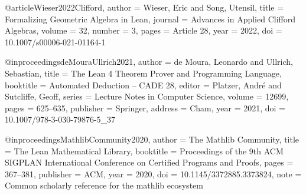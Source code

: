 \documentclass[11pt,a4paper]{article}
\theoremstyle{plain}
\theoremstyle{definition}
\theoremstyle{remark}
\begin{document}
@article{Wieser2022Clifford,
  author  = {Wieser, Eric and Song, Utensil},
  title   = {Formalizing Geometric Algebra in {Lean}},
  journal = {Advances in Applied Clifford Algebras},
  volume  = {32},
  number  = {3},
  pages   = {Article 28},
  year    = {2022},
  doi     = {10.1007/s00006-021-01164-1}
}

@inproceedings{deMouraUllrich2021,
  author    = {de Moura, Leonardo and Ullrich, Sebastian},
  title     = {The {Lean} 4 Theorem Prover and Programming Language},
  booktitle = {Automated Deduction -- {CADE} 28},
  editor    = {Platzer, Andr{\'e} and Sutcliffe, Geoff},
  series    = {Lecture Notes in Computer Science},
  volume    = {12699},
  pages     = {625--635},
  publisher = {Springer},
  address   = {Cham},
  year      = {2021},
  doi       = {10.1007/978-3-030-79876-5_37}
}

@inproceedings{MathlibCommunity2020,
  author    = {{The Mathlib Community}},
  title     = {The {Lean} Mathematical Library},
  booktitle = {Proceedings of the 9th {ACM} {SIGPLAN} International Conference
               on Certified Programs and Proofs},
  pages     = {367--381},
  publisher = {ACM},
  year      = {2020},
  doi       = {10.1145/3372885.3373824},
  note      = {Common scholarly reference for the mathlib ecosystem}
}

\end{document}
